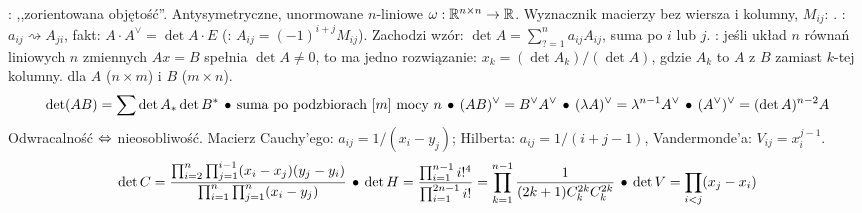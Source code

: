 :  ,,zorientowana objętość''.
Antysymetryczne, unormowane $n$-liniowe $\omega: \mathbb{R}^{n \times n} \to \mathbb{R}$.
Wyznacznik macierzy bez wiersza i kolumny, $M_{ij}$: .
: $a_{ij} \rightsquigarrow A_{ji}$, fakt: $A \cdot A^\vee = \det A \cdot E$ (: $A_{ij} = (-1)^{i+j} M_{ij}$).
Zachodzi wzór: $\det A = \sum_{{?} = 1}^n a_{ij}A_{ij}$, suma po $i$ lub $j$.
: jeśli układ $n$ równań liniowych $n$ zmiennych $Ax = B$ spełnia $\det A \neq 0$, to ma jedno rozwiązanie: $x_k = (\det A_k) / (\det A)$, gdzie $A_k$ to $A$ z $B$ zamiast $k$-tej kolumny.
 dla $A$ ($n \times m$) i $B$ ($m \times n$).
\[
	\det(AB) = \sum \det A_* \det B^* \, \bullet \,
 	\mbox{suma po podzbiorach } [m] \mbox{ mocy } n \, \bullet \,
 	(AB)^\vee = B^\vee A^\vee \, \bullet \,
 	(\lambda A)^\vee = \lambda^{n-1} A^\vee \, \bullet \,
 	(A^\vee)^\vee = (\det A)^{n-2} A
\]
Odwracalność $\Leftrightarrow$ nieosobliwość.
Macierz Cauchy'ego: $a_{ij} = 1/(x_i - y_j)$; Hilberta: $a_{ij} = 1/(i+j-1)$, Vandermonde'a: $V_{ij} = x_i^{j-1}$.
\[
	\det C={{\prod_{i=2}^n \prod_{j=1}^{i-1} (x_i-x_j)(y_j-y_i)}\over {\prod_{i=1}^n \prod_{j=1}^n (x_i-y_j)}} \, \bullet \,
 	\det H = \frac{\prod_{i=1}^{n-1}i!^4}{\prod_{i=1}^{2n-1}i!} = 
 	\prod_{k=1}^{n-1} \frac{1}{(2k+1)C_k^{2k}C_k^{2k} } \, \bullet \, 
	\det V = \prod_{i < j} (x_j-x_i)
\]
